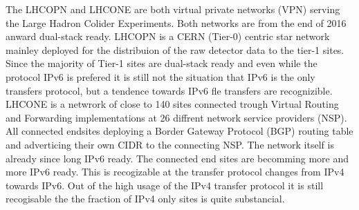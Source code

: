 
The LHCOPN and LHCONE are both virtual private networks (VPN) serving the Large Hadron Colider Experiments. Both networks are from the end of 2016 anward dual-stack ready. LHCOPN is a CERN (Tier-0) centric star network mainley deployed for the distribuion of the raw detector data to the tier-1 sites. Since the majority of Tier-1 sites are dual-stack ready and even while the protocol IPv6 is prefered it is still not the situation that IPv6 is the only transfers protocol, but a tendence towards IPv6 fle transfers are recognizible. LHCONE is a netwrork of close to 140 sites connected trough Virtual Routing and Forwarding implementations at 26 diffrent network service providers (NSP). All connected endsites deploying a Border Gateway Protocol (BGP) routing table and adverticing their own CIDR to the connecting NSP. The network itself is already since long IPv6 ready. The connected end sites are becomming more and more IPv6 ready. This is recogizable at the  transfer protocol changes from IPv4 towards IPv6. Out of the high usage of the IPv4 transfer protocol it is still recogisable the the fraction of IPv4 only sites is quite substancial.
